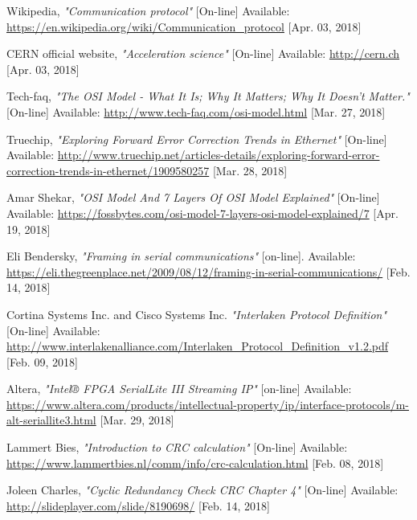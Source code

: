 \begin{thebibliography}{9}

	Wikipedia,
	\textit{"Communication protocol"}
	[On-line] Available:
	\url{https://en.wikipedia.org/wiki/Communication_protocol} [Apr. 03, 2018]

	CERN official website,
	\textit{"Acceleration science"}
	[On-line] Available:
	\url{http://cern.ch} [Apr. 03, 2018]

	Tech-faq,
	\textit{"The OSI Model - What It Is; Why It Matters; Why It Doesn't Matter."}
	[On-line] Available:
	\url{http://www.tech-faq.com/osi-model.html} [Mar. 27, 2018]
	
	Truechip,
	\textit{"Exploring Forward Error Correction Trends in Ethernet"}
	[On-line] Available:
	\url{http://www.truechip.net/articles-details/exploring-forward-error-correction-trends-in-ethernet/1909580257} [Mar. 28, 2018]

	Amar Shekar,
	\textit{"OSI Model And 7 Layers Of OSI Model Explained"}
	[On-line] Available:
	\url{https://fossbytes.com/osi-model-7-layers-osi-model-explained/7} [Apr. 19, 2018]

	Eli Bendersky,
	\textit{"Framing in serial communications"}
	[on-line]. Available:\\
	\url{https://eli.thegreenplace.net/2009/08/12/framing-in-serial-communications/} [Feb. 14, 2018]
	
	Cortina Systems Inc. and Cisco Systems Inc.
	\textit{"Interlaken	Protocol Definition"}
	[On-line] Available:
	\url{http://www.interlakenalliance.com/Interlaken_Protocol_Definition_v1.2.pdf} [Feb. 09, 2018]

	Altera,
	\textit{"Intel® FPGA SerialLite III Streaming IP"}
	[on-line] Available:
	\url{https://www.altera.com/products/intellectual-property/ip/interface-protocols/m-alt-seriallite3.html} [Mar. 29, 2018]

	Lammert Bies,
	\textit{"Introduction to CRC calculation"}
	[On-line] Available:
	\url{https://www.lammertbies.nl/comm/info/crc-calculation.html} [Feb. 08, 2018]

	Joleen Charles,
	\textit{"Cyclic Redundancy Check CRC Chapter 4"}
	[On-line] Available:
	\url{http://slideplayer.com/slide/8190698/} [Feb. 14, 2018]


\end{thebibliography}
